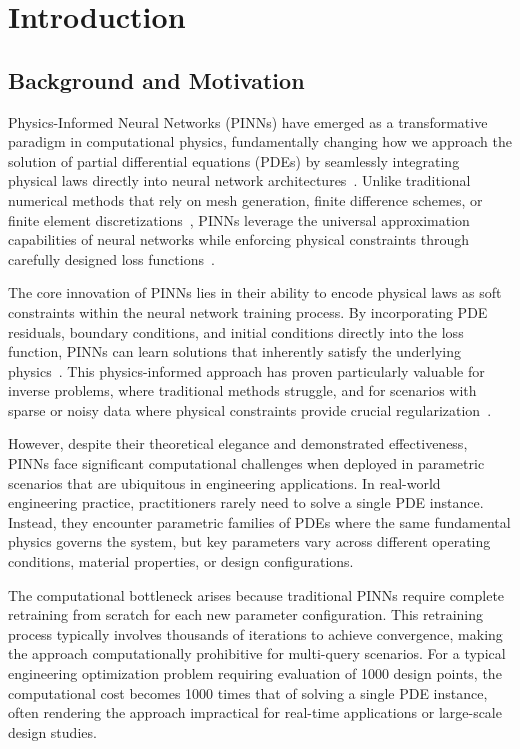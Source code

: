 \documentclass[review]{elsarticle}
\begin{document}
\linenumbers
\section{Introduction}

\subsection{Background and Motivation}

Physics-Informed Neural Networks (PINNs) have emerged as a transformative paradigm in computational physics, fundamentally changing how we approach the solution of partial differential equations (PDEs) by seamlessly integrating physical laws directly into neural network architectures~\cite{raissi2019physics}. Unlike traditional numerical methods that rely on mesh generation, finite difference schemes, or finite element discretizations~\cite{quarteroni2010numerical,brenner2008mathematical}, PINNs leverage the universal approximation capabilities of neural networks while enforcing physical constraints through carefully designed loss functions~\cite{sirignano2018dgm,weinan2017deep}.

The core innovation of PINNs lies in their ability to encode physical laws as soft constraints within the neural network training process. By incorporating PDE residuals, boundary conditions, and initial conditions directly into the loss function, PINNs can learn solutions that inherently satisfy the underlying physics~\cite{karniadakis2021physics,cuomo2022scientific}. This physics-informed approach has proven particularly valuable for inverse problems, where traditional methods struggle, and for scenarios with sparse or noisy data where physical constraints provide crucial regularization~\cite{haghighat2021physics,chen2020physics}.

However, despite their theoretical elegance and demonstrated effectiveness, PINNs face significant computational challenges when deployed in parametric scenarios that are ubiquitous in engineering applications. In real-world engineering practice, practitioners rarely need to solve a single PDE instance. Instead, they encounter parametric families of PDEs where the same fundamental physics governs the system, but key parameters vary across different operating conditions, material properties, or design configurations.

The computational bottleneck arises because traditional PINNs require complete retraining from scratch for each new parameter configuration. This retraining process typically involves thousands of iterations to achieve convergence, making the approach computationally prohibitive for multi-query scenarios. For a typical engineering optimization problem requiring evaluation of 1000 design points, the computational cost becomes 1000 times that of solving a single PDE instance, often rendering the approach impractical for real-time applications or large-scale design studies.
\end{document}
